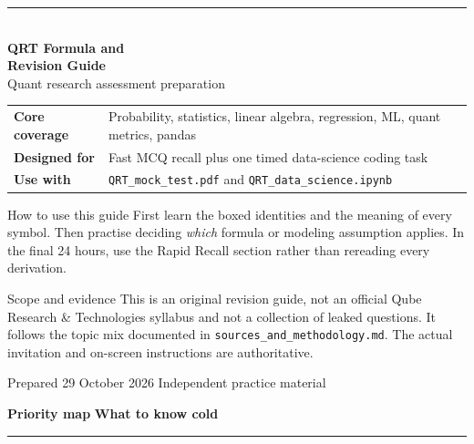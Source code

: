 \documentclass[10pt,a4paper]{article}
\newcommand{\sectionbanner}[2]{%
  \vspace{2mm}
  {\color{navy}\Large\bfseries #1}\hfill
  {\color{blue}\bfseries #2}
  \par\vspace{1mm}\color{line}\rule{\linewidth}{0.8pt}\color{ink}\vspace{2mm}
}
\begin{document}
\thispagestyle{empty}
\vspace*{9mm}
{\color{blue}\rule{20mm}{2.2pt}}\\[7mm]
{\fontsize{27}{31}\selectfont\bfseries\color{navy} QRT Formula and\\Revision Guide}\\[4mm]
{\Large\color{blue} Quant research assessment preparation}\par

\vspace{10mm}
\begin{tcolorbox}[colback=navy,colframe=navy,arc=2mm,left=5mm,right=5mm,top=4mm,bottom=4mm]
\color{white}
\begin{tabularx}{\linewidth}{>{\bfseries}lX}
Core coverage & Probability, statistics, linear algebra, regression, ML, quant metrics, pandas \\
Designed for & Fast MCQ recall plus one timed data-science coding task \\
Use with & \texttt{QRT\_mock\_test.pdf} and \texttt{QRT\_data\_science.ipynb}
\end{tabularx}
\end{tcolorbox}

\vspace{8mm}
\begin{keybox}{How to use this guide}
First learn the boxed identities and the meaning of every symbol. Then practise deciding \emph{which} formula or modeling assumption applies. In the final 24 hours, use the Rapid Recall section rather than rereading every derivation.
\end{keybox}

\vspace{4mm}
\begin{trapbox}{Scope and evidence}
This is an original revision guide, not an official Qube Research \& Technologies syllabus and not a collection of leaked questions. It follows the topic mix documented in \texttt{sources\_and\_methodology.md}. The actual invitation and on-screen instructions are authoritative.
\end{trapbox}

\vfill
{\small\color{muted}Prepared 29 October 2026 \hfill Independent practice material}
\newpage

\sectionbanner{Priority map}{What to know cold}
\end{document}
